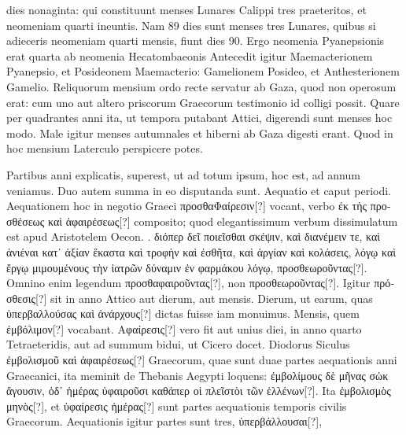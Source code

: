 dies nonaginta: qui constituunt menses Lunares Calippi tres praeteritos,
et neomeniam quarti ineuntis.
Nam 89 dies sunt menses tres
Lunares, quibus si adieceris neomeniam quarti mensis, fiunt dies 90.
Ergo neomenia Pyanepsionis erat quarta ab neomenia Hecatombaeonis
Antecedit igitur Maemacterionem Pyanepsio, et Posideonem
Maemacterio: Gamelionem Posideo, et Anthesterionem Gamelio.
Reliquorum mensium ordo recte servatur ab Gaza, quod non operosum
erat: cum uno aut altero priscorum Graecorum testimonio
id colligi possit.
Quare per quadrantes anni ita, ut tempora putabant
Attici, digerendi sunt menses hoc modo.
Male igitur menses
autumnales et hiberni ab Gaza digesti erant.
%
Quod in hoc mensium
Laterculo perspicere potes.
%
\begin{table}[htbp]

\end{table}
%
Partibus anni explicatis, superest, ut ad
totum ipsum, hoc est, ad annum veniamus.
Duo autem summa in eo disputanda
sunt.
Aequatio et caput periodi.
Aequationem
hoc in negotio Graeci \textgreek{προσθαΦαίρεσιν[?]}
vocant, verbo \textgreek{έκ τὴς προσθέσεως καὶ ἀφαιρέσεως[?]}
composito; quod elegantissimum verbum
dissimulatum est apud Aristotelem Oecon.
. \textgreek{διόπερ δεῖ ποιεῖσθαι σκέψιν, καὶ διανέμειν τε, καὶ ἀνιέναι
κατ᾽ ἀξίαν ἕκαστα καὶ τροφὴν καὶ ἐσθῆτα, καὶ
ἀργίαν καὶ κολάσεις, λόγῳ καὶ ἔργῳ μιμουμένους
τὴν ἰατρῶν δύναμιν ἐν φαρμάκου λόγῳ,
προσθεωροῦντας[?]}.
Omnino enim legendum
\textgreek{προσθαφαιροῦντας[?]}, non \textgreek{προσθεωροῦντας[?]}.
Igitur
\textgreek{πρόσθεσις[?]} sit in anno Attico aut dierum, aut
mensis.
Dierum, ut earum, quas \textgreek{ὑπερβαλλούσας
καὶ ἀνάρχους[?]} dictas fuisse iam monuimus.
Mensis, quem \textgreek{ἐμβόλιμον[?]} vocabant.
\textgreek{Αφαίρεσις[?]} vero fit aut unius diei, in anno
quarto Tetraeteridis, aut ad summum bidui,
ut Cicero docet.
Diodorus Siculus \textgreek{ἐμβολισμοῦ
καὶ ἀφαιρέσεως[?]} Graecorum, quae
sunt duae partes aequationis anni Graecanici,
ita meminit de Thebanis Aegypti loquens:
\textgreek{ἐμβολίμους δὲ μῆνας σὠκ ἄγουσιν, ὀδ᾽
ἡμέρας ὑφαιροῦσι καθάπερ οἱ πλεῖστὸι τῶν ἑλλένων[?]}.
Ita \textgreek{ἐμβολισμὸς μηνὸς[?]}, et
\textgreek{ὑφαίρεσις ἡμέρας[?]} sunt partes aequationis
 temporis civilis Graecorum.
Aequationis igitur partes sunt tres, \textgreek{ὑπερβάλλουσαι[?]},
